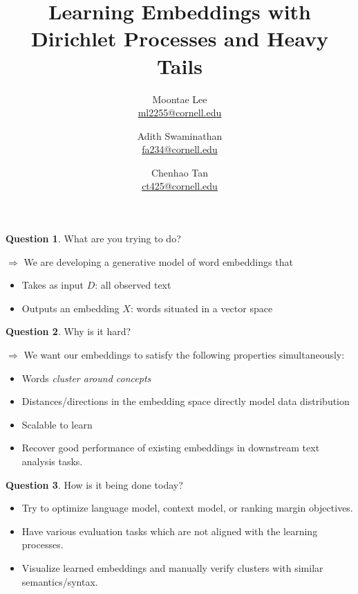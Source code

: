 \documentclass[11pt]{article}
\title{Learning Embeddings with Dirichlet Processes and Heavy Tails}
\author{%
  Moontae Lee \\ \href{ml2255@cornell.edu}{ml2255@cornell.edu}
  \and Adith Swaminathan\\ \href{fa234@cornell.edu}{fa234@cornell.edu}
  \and Chenhao Tan\\ \href{chenhao@cs.cornell.edu}{ct425@cornell.edu} 
}
\theoremstyle{plain} \numberwithin{equation}{section}
\theoremstyle{definition}
\newtheorem{question}{Question}
\begin{document}
\maketitle


\begin{question}{What are you trying to do?}\end{question}
\vspace{-10px}
$\Rightarrow$ We are developing a generative model of word embeddings that
\begin{itemize}
  \vspace{-10px}
  \setlength\itemsep{1px}
  \setlength{\itemindent}{0.4in}
  \item Takes as input $D$: all observed text
  \item Outputs an embedding $X$: words situated in a vector space
\end{itemize}
\vspace{3px}


\begin{question}{Why is it hard?}\end{question}
\vspace{-10px}
$\Rightarrow$ We want our embeddings to satisfy the following properties simultaneously:
\begin{itemize}
  \vspace{-10px}
  \setlength\itemsep{1px}
  \setlength{\itemindent}{0.4in}
  \item Words \emph{cluster around concepts}
  \item Distances/directions in the embedding space directly model data distribution
  \item Scalable to learn
  \item Recover good performance of existing embeddings in downstream text analysis tasks.
\end{itemize}
\vspace{3px}


\begin{question}{How is it being done today?}\end{question}
\vspace{-10px}
\begin{itemize}
  \vspace{-10px}
  \setlength\itemsep{1px}
  \setlength{\itemindent}{0.4in}
  \item Try to optimize language model, context model, or ranking margin objectives.
  \item Have various evaluation tasks which are not aligned with the learning processes.
  \item Visualize learned embeddings and manually verify clusters with similar semantics/syntax.
\end{itemize}
\vspace{3px}
\end{document}
